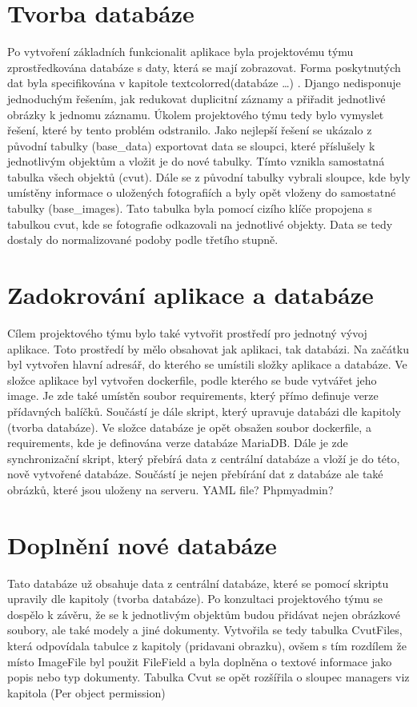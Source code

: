 \section{Tvorba databáze}

Po vytvoření základních funkcionalit aplikace byla projektovému týmu zprostředkována databáze s daty, která se mají zobrazovat. Forma poskytnutých dat byla specifikována v kapitole textcolor{red}{(databáze …)} . Django nedisponuje jednoduchým řešením, jak redukovat duplicitní záznamy a přiřadit jednotlivé obrázky k jednomu záznamu. Úkolem projektového týmu tedy bylo vymyslet řešení, které by tento problém odstranilo. Jako nejlepší řešení se ukázalo z původní tabulky (base\_data) exportovat data se sloupci, které příslušely k jednotlivým objektům a vložit je do nové tabulky. Tímto vznikla samostatná tabulka všech objektů (cvut). Dále se z původní tabulky vybrali sloupce, kde byly umístěny informace o uložených fotografiích a byly opět vloženy do samostatné tabulky (base\_images). Tato tabulka byla pomocí cizího klíče propojena s tabulkou cvut, kde se fotografie odkazovali na jednotlivé objekty. Data se tedy dostaly do normalizované podoby podle třetího stupně.


\section{Zadokrování aplikace a databáze}

Cílem projektového týmu bylo také vytvořit prostředí pro jednotný vývoj aplikace. Toto prostředí by mělo obsahovat jak aplikaci, tak databázi. Na začátku byl vytvořen hlavní adresář, do kterého se umístili složky aplikace a databáze. Ve složce aplikace byl vytvořen dockerfile, podle kterého se bude vytvářet jeho image. Je zde také umístěn soubor requirements, který přímo definuje verze přídavných balíčků. Součástí je dále skript, který upravuje databázi dle kapitoly (tvorba databáze). Ve složce databáze je opět obsažen soubor dockerfile, a requirements, kde je definována verze databáze MariaDB. Dále je zde synchronizační skript, který přebírá data z centrální databáze a vloží je do této, nově vytvořené databáze. Součástí je nejen přebírání dat z databáze ale také obrázků, které jsou uloženy na serveru. YAML file? Phpmyadmin?


\section{Doplnění nové databáze}

Tato databáze už obsahuje data z centrální databáze, které se pomocí skriptu upravily dle kapitoly (tvorba databáze). Po konzultaci projektového týmu se dospělo k závěru, že se k jednotlivým objektům budou přidávat nejen obrázkové soubory, ale také modely a jiné dokumenty. Vytvořila se tedy tabulka CvutFiles, která odpovídala tabulce z kapitoly (pridavani obrazku), ovšem s tím rozdílem že místo ImageFile byl použit FileField a byla doplněna o textové informace jako popis nebo typ dokumenty. Tabulka Cvut se opět rozšířila o sloupec managers viz kapitola (Per object permission)

